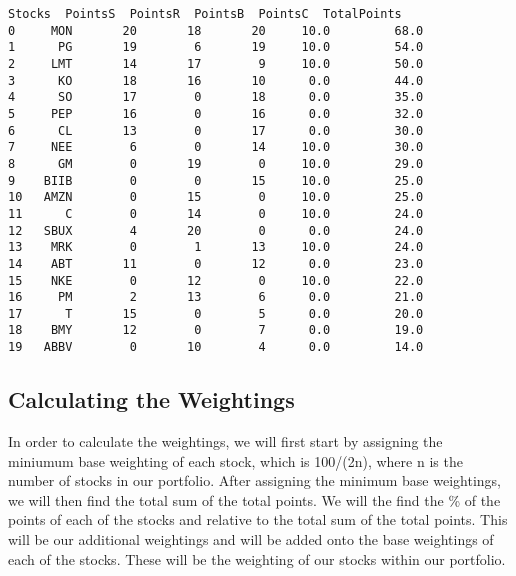 \documentclass[11pt]{article}
\makeatletter
\newcommand{\boxspacing}{\kern\kvtcb@left@rule\kern\kvtcb@boxsep}
\newcommand{\prompt}[4]{
        {\ttfamily\llap{{\color{#2}[#3]:\hspace{3pt}#4}}\vspace{-\baselineskip}}
    }
\makeatother
\begin{document}
            \begin{tcolorbox}[breakable, size=fbox, boxrule=.5pt, pad at break*=1mm, opacityfill=0]
\prompt{Out}{outcolor}{35}{\boxspacing}
\begin{Verbatim}[commandchars=\\\{\}]
   Stocks  PointsS  PointsR  PointsB  PointsC  TotalPoints
0     MON       20       18       20     10.0         68.0
1      PG       19        6       19     10.0         54.0
2     LMT       14       17        9     10.0         50.0
3      KO       18       16       10      0.0         44.0
4      SO       17        0       18      0.0         35.0
5     PEP       16        0       16      0.0         32.0
6      CL       13        0       17      0.0         30.0
7     NEE        6        0       14     10.0         30.0
8      GM        0       19        0     10.0         29.0
9    BIIB        0        0       15     10.0         25.0
10   AMZN        0       15        0     10.0         25.0
11      C        0       14        0     10.0         24.0
12   SBUX        4       20        0      0.0         24.0
13    MRK        0        1       13     10.0         24.0
14    ABT       11        0       12      0.0         23.0
15    NKE        0       12        0     10.0         22.0
16     PM        2       13        6      0.0         21.0
17      T       15        0        5      0.0         20.0
18    BMY       12        0        7      0.0         19.0
19   ABBV        0       10        4      0.0         14.0
\end{Verbatim}
\end{tcolorbox}
        
    \hypertarget{calculating-the-weightings}{%
\subsection{Calculating the
Weightings}\label{calculating-the-weightings}}

In order to calculate the weightings, we will first start by assigning
the miniumum base weighting of each stock, which is 100/(2n), where n is
the number of stocks in our portfolio. After assigning the minimum base
weightings, we will then find the total sum of the total points. We will
the find the \% of the points of each of the stocks and relative to the
total sum of the total points. This will be our additional weightings
and will be added onto the base weightings of each of the stocks. These
will be the weighting of our stocks within our portfolio.
\end{document}
